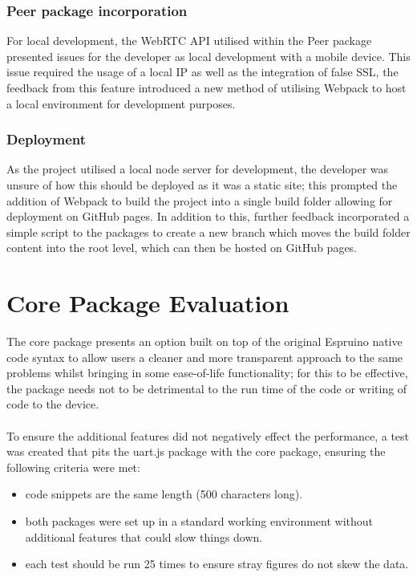 \documentclass{l4proj}
\begin{document}
\subsubsection{Peer package incorporation}
For local development, the WebRTC API utilised within the Peer package presented issues for the developer as local development with a mobile device. This issue required the usage of a local IP as well as the integration of false SSL, the feedback from this feature introduced a new method of utilising Webpack to host a local environment for development purposes.
\subsubsection{Deployment}
As the project utilised a local node server for development, the developer was unsure of how this should be deployed as it was a static site; this prompted the addition of Webpack to build the project into a single build folder allowing for deployment on GitHub pages. In addition to this, further feedback incorporated a simple script to the packages to create a new branch which moves the build folder content into the root level, which can then be hosted on GitHub pages.
\section{Core Package Evaluation}

The core package presents an option built on top of the original Espruino native code syntax to allow users a cleaner and more transparent approach to the same problems whilst bringing in some ease-of-life functionality; for this to be effective, the package needs not to be detrimental to the run time of the code or writing of code to the device.
\\ \\
To ensure the additional features did not negatively effect the performance, a test was created that pits the uart.js package with the core package, ensuring the following criteria were met:

\begin{itemize}
    \item code snippets are the same length (500 characters long).
    \item both packages were set up in a standard working environment without additional features that could slow things down.
    \item each test should be run 25 times to ensure stray figures do not skew the data.
\end{itemize}
\end{document}

